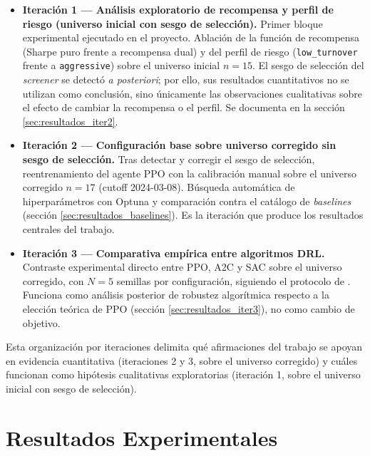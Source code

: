 \documentclass[IB,a4paper]{TFUOC}
\begin{document}
\begin{itemize}
    \item \textbf{Iteración 1 --- Análisis exploratorio de recompensa y perfil de riesgo (universo inicial con sesgo de selección).} Primer bloque experimental ejecutado en el proyecto. Ablación de la función de recompensa (Sharpe puro frente a recompensa dual) y del perfil de riesgo (\texttt{low\_turnover} frente a \texttt{aggressive}) sobre el universo inicial $n=15$. El sesgo de selección del \textit{screener} se detectó \textit{a posteriori}; por ello, sus resultados cuantitativos no se utilizan como conclusión, sino únicamente las observaciones cualitativas sobre el efecto de cambiar la recompensa o el perfil. Se documenta en la sección \ref{sec:resultados_iter2}.
    \item \textbf{Iteración 2 --- Configuración base sobre universo corregido sin sesgo de selección.} Tras detectar y corregir el sesgo de selección, reentrenamiento del agente PPO con la calibración manual sobre el universo corregido $n=17$ (cutoff 2024-03-08). Búsqueda automática de hiperparámetros con Optuna y comparación contra el catálogo de \textit{baselines} (sección \ref{sec:resultados_baselines}). Es la iteración que produce los resultados centrales del trabajo.
    \item \textbf{Iteración 3 --- Comparativa empírica entre algoritmos DRL.} Contraste experimental directo entre PPO, A2C y SAC sobre el universo corregido, con $N=5$ semillas por configuración, siguiendo el protocolo de \citet{henderson2018deeprl}. Funciona como análisis posterior de robustez algorítmica respecto a la elección teórica de PPO (sección \ref{sec:resultados_iter3}), no como cambio de objetivo.
\end{itemize}

Esta organización por iteraciones delimita qué afirmaciones del trabajo se apoyan en evidencia cuantitativa (iteraciones 2 y 3, sobre el universo corregido) y cuáles funcionan como hipótesis cualitativas exploratorias (iteración 1, sobre el universo inicial con sesgo de selección).

\chapter{Resultados Experimentales}
\label{cap:resultados}
\end{document}
